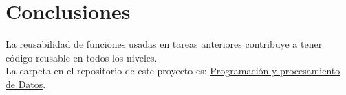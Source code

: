 \documentclass{assignment}
\begin{document}
	\section*{Conclusiones}
	La reusabilidad de funciones usadas en tareas anteriores contribuye a tener código reusable en todos los niveles.\\
	La carpeta en el repositorio de este proyecto es: \href{https://github.com/clivan/Programacion_y_Procesamiento_de_Datos_Infotec/2B}{Programación y procesamiento de Datos}.	
\end{document}
